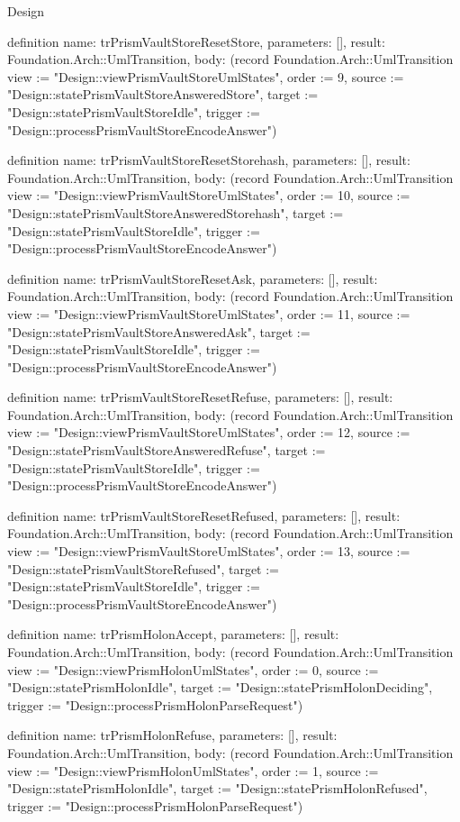 \begin{lexlean}{Design}
\begin{semanticmodule}
definition{
  name: trPrismVaultStoreResetStore,
  parameters: [],
  result: Foundation.Arch::UmlTransition,
  body: (record Foundation.Arch::UmlTransition {view := "Design::viewPrismVaultStoreUmlStates", order := 9, source := "Design::statePrismVaultStoreAnsweredStore", target := "Design::statePrismVaultStoreIdle", trigger := "Design::processPrismVaultStoreEncodeAnswer"})
}

definition{
  name: trPrismVaultStoreResetStorehash,
  parameters: [],
  result: Foundation.Arch::UmlTransition,
  body: (record Foundation.Arch::UmlTransition {view := "Design::viewPrismVaultStoreUmlStates", order := 10, source := "Design::statePrismVaultStoreAnsweredStorehash", target := "Design::statePrismVaultStoreIdle", trigger := "Design::processPrismVaultStoreEncodeAnswer"})
}

definition{
  name: trPrismVaultStoreResetAsk,
  parameters: [],
  result: Foundation.Arch::UmlTransition,
  body: (record Foundation.Arch::UmlTransition {view := "Design::viewPrismVaultStoreUmlStates", order := 11, source := "Design::statePrismVaultStoreAnsweredAsk", target := "Design::statePrismVaultStoreIdle", trigger := "Design::processPrismVaultStoreEncodeAnswer"})
}

definition{
  name: trPrismVaultStoreResetRefuse,
  parameters: [],
  result: Foundation.Arch::UmlTransition,
  body: (record Foundation.Arch::UmlTransition {view := "Design::viewPrismVaultStoreUmlStates", order := 12, source := "Design::statePrismVaultStoreAnsweredRefuse", target := "Design::statePrismVaultStoreIdle", trigger := "Design::processPrismVaultStoreEncodeAnswer"})
}

definition{
  name: trPrismVaultStoreResetRefused,
  parameters: [],
  result: Foundation.Arch::UmlTransition,
  body: (record Foundation.Arch::UmlTransition {view := "Design::viewPrismVaultStoreUmlStates", order := 13, source := "Design::statePrismVaultStoreRefused", target := "Design::statePrismVaultStoreIdle", trigger := "Design::processPrismVaultStoreEncodeAnswer"})
}

definition{
  name: trPrismHolonAccept,
  parameters: [],
  result: Foundation.Arch::UmlTransition,
  body: (record Foundation.Arch::UmlTransition {view := "Design::viewPrismHolonUmlStates", order := 0, source := "Design::statePrismHolonIdle", target := "Design::statePrismHolonDeciding", trigger := "Design::processPrismHolonParseRequest"})
}

definition{
  name: trPrismHolonRefuse,
  parameters: [],
  result: Foundation.Arch::UmlTransition,
  body: (record Foundation.Arch::UmlTransition {view := "Design::viewPrismHolonUmlStates", order := 1, source := "Design::statePrismHolonIdle", target := "Design::statePrismHolonRefused", trigger := "Design::processPrismHolonParseRequest"})
}


\end{semanticmodule}
\end{lexlean}
